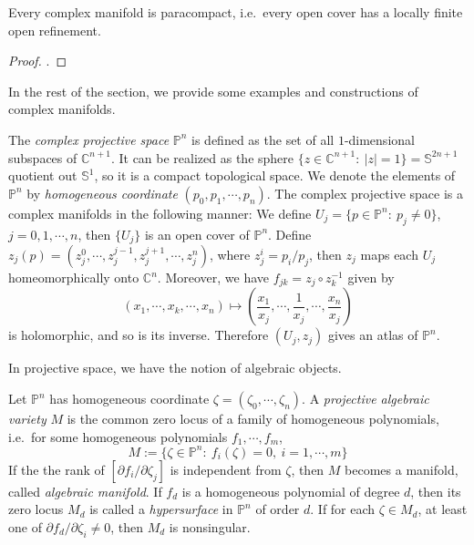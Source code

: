 \begin{lem}
    Every complex manifold is paracompact, i.e.\ every open cover has a locally finite open refinement.
\end{lem}
\begin{proof}
    \cite[Theorem~4.77]{LeeTop}.
\end{proof}

In the rest of the section, we provide some examples and constructions of complex manifolds.

\begin{cons}
    The \emph{complex projective space} $\mathbb{P}^n$ is defined as the set of all $1$-dimensional subspaces of $\mathbb{C}^{n+1}$.
    It can be realized as the sphere $\{z\in\mathbb{C}^{n+1}:\ |z|=1\}=\mathbb{S}^{2n+1}$ quotient out $\mathbb{S}^1$, so it is a compact topological space.
    We denote the elements of $\mathbb{P}^n$ by \emph{homogeneous coordinate} $(p_0,p_1,\cdots,p_n)$.
    The complex projective space is a complex manifolds in the following manner:
    We define $U_j=\{p\in\mathbb{P}^n:\ p_j\neq 0\}$, $j=0,1,\cdots,n$, then $\{U_j\}$ is an open cover of $\mathbb{P}^n$.
    Define $z_j(p)=(z_j^0,\cdots,z_j^{j-1},z_j^{j+1},\cdots,z_j^n)$, where $z_j^i=p_i/p_j$, then $z_j$ maps each $U_j$ homeomorphically onto $\mathbb{C}^n$.
    Moreover, we have $f_{jk}=z_j\circ z_k^{-1}$ given by
    \[(x_1,\cdots,x_k,\cdots,x_n)\mapsto\left(\frac{x_1}{x_j},\cdots,\frac{1}{x_j},\cdots,\frac{x_n}{x_j}\right)\]
    is holomorphic, and so is its inverse.
    Therefore $(U_j,z_j)$ gives an atlas of $\mathbb{P}^n$.
\end{cons}

In projective space, we have the notion of algebraic objects.

\begin{defn}
    Let $\mathbb{P}^n$ has homogeneous coordinate $\zeta=(\zeta_0,\cdots,\zeta_n)$.
    A \emph{projective algebraic variety} $M$ is the common zero locus of a family of homogeneous polynomials, i.e.\ for some homogeneous polynomials $f_1,\cdots,f_m$, 
    \[M:=\{\zeta\in\mathbb{P}^n:\ f_i(\zeta)=0,\ i=1,\cdots,m\}\]
    If the the rank of $[\partial{f_i}/\partial{\zeta_j}]$ is independent from $\zeta$, then $M$ becomes a manifold, called \emph{algebraic manifold}.
    If $f_d$ is a homogeneous polynomial of degree $d$, then its zero locus $M_d$ is called a \emph{hypersurface} in $\mathbb{P}^n$ of order $d$.
    If for each $\zeta\in M_d$, at least one of $\partial f_d/\partial\zeta_i\neq 0$, then $M_d$ is nonsingular.
\end{defn}

